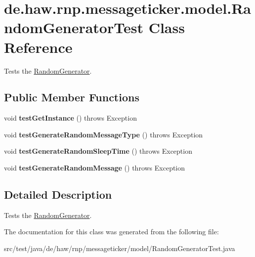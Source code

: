 \hypertarget{classde_1_1haw_1_1rnp_1_1messageticker_1_1model_1_1RandomGeneratorTest}{\section{de.\-haw.\-rnp.\-messageticker.\-model.\-Random\-Generator\-Test Class Reference}
\label{classde_1_1haw_1_1rnp_1_1messageticker_1_1model_1_1RandomGeneratorTest}
}


Tests the \hyperlink{classde_1_1haw_1_1rnp_1_1messageticker_1_1model_1_1RandomGenerator}{Random\-Generator}.  


\subsection*{Public Member Functions}
\begin{DoxyCompactItemize}
\item 
\hypertarget{classde_1_1haw_1_1rnp_1_1messageticker_1_1model_1_1RandomGeneratorTest_a2c816510f48220b44ff7d6bb66e2cac7}{void {\bfseries test\-Get\-Instance} ()  throws Exception }\label{classde_1_1haw_1_1rnp_1_1messageticker_1_1model_1_1RandomGeneratorTest_a2c816510f48220b44ff7d6bb66e2cac7}

\item 
\hypertarget{classde_1_1haw_1_1rnp_1_1messageticker_1_1model_1_1RandomGeneratorTest_a16dd54feb1edc7ac408d0f0c49609fad}{void {\bfseries test\-Generate\-Random\-Message\-Type} ()  throws Exception }\label{classde_1_1haw_1_1rnp_1_1messageticker_1_1model_1_1RandomGeneratorTest_a16dd54feb1edc7ac408d0f0c49609fad}

\item 
\hypertarget{classde_1_1haw_1_1rnp_1_1messageticker_1_1model_1_1RandomGeneratorTest_aaa386fae73ac945f8700b1a590a2fef7}{void {\bfseries test\-Generate\-Random\-Sleep\-Time} ()  throws Exception }\label{classde_1_1haw_1_1rnp_1_1messageticker_1_1model_1_1RandomGeneratorTest_aaa386fae73ac945f8700b1a590a2fef7}

\item 
\hypertarget{classde_1_1haw_1_1rnp_1_1messageticker_1_1model_1_1RandomGeneratorTest_a809bb20e71f3475224f7c71e37495346}{void {\bfseries test\-Generate\-Random\-Message} ()  throws Exception }\label{classde_1_1haw_1_1rnp_1_1messageticker_1_1model_1_1RandomGeneratorTest_a809bb20e71f3475224f7c71e37495346}

\end{DoxyCompactItemize}


\subsection{Detailed Description}
Tests the \hyperlink{classde_1_1haw_1_1rnp_1_1messageticker_1_1model_1_1RandomGenerator}{Random\-Generator}. 

The documentation for this class was generated from the following file\-:\begin{DoxyCompactItemize}
\item 
src/test/java/de/haw/rnp/messageticker/model/Random\-Generator\-Test.\-java\end{DoxyCompactItemize}
